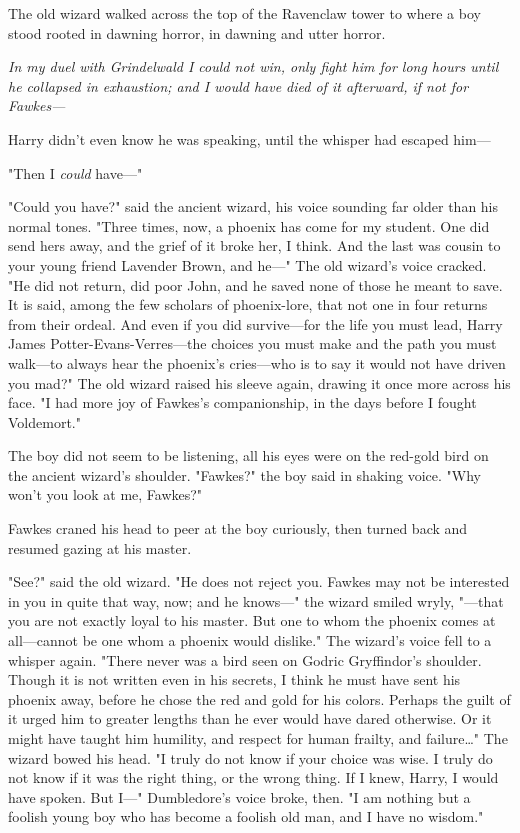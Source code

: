 The old wizard walked across the top of the Ravenclaw tower to where a boy 
stood rooted in dawning horror, in dawning and utter horror.

\emph{In my duel with Grindelwald I could not win, only fight him for long 
hours until he collapsed in exhaustion; and I would have died of it afterward, 
if not for Fawkes---}

Harry didn't even know he was speaking, until the whisper had escaped him---

"Then I \emph{could} have---"

"Could you have?" said the ancient wizard, his voice sounding far older than 
his normal tones. "Three times, now, a phoenix has come for my student. One did 
send hers away, and the grief of it broke her, I think. And the last was cousin 
to your young friend Lavender Brown, and he---" The old wizard's voice cracked. 
"He did not return, did poor John, and he saved none of those he meant to save. 
It is said, among the few scholars of phoenix-lore, that not one in four 
returns from their ordeal. And even if you did survive---for the life you must 
lead, Harry James Potter-Evans-Verres---the choices you must make and the path 
you must walk---to always hear the phoenix's cries---who is to say it would not 
have driven you mad?" The old wizard raised his sleeve again, drawing it once 
more across his face. "I had more joy of Fawkes's companionship, in the days 
before I fought Voldemort."

The boy did not seem to be listening, all his eyes were on the red-gold bird on 
the ancient wizard's shoulder. "Fawkes?" the boy said in shaking voice. "Why 
won't you look at me, Fawkes?"

Fawkes craned his head to peer at the boy curiously, then turned back and 
resumed gazing at his master.

"See?" said the old wizard. "He does not reject you. Fawkes may not be 
interested in you in quite that way, now; and he knows---" the wizard smiled 
wryly, "---that you are not exactly loyal to his master. But one to whom the 
phoenix comes at all---cannot be one whom a phoenix would dislike." The 
wizard's voice fell to a whisper again. "There never was a bird seen on Godric 
Gryffindor's shoulder. Though it is not written even in his secrets, I think he 
must have sent his phoenix away, before he chose the red and gold for his 
colors. Perhaps the guilt of it urged him to greater lengths than he ever would 
have dared otherwise. Or it might have taught him humility, and respect for 
human frailty, and failure{\ldots}" The wizard bowed his head. "I truly do not 
know if your choice was wise. I truly do not know if it was the right thing, or 
the wrong thing. If I knew, Harry, I would have spoken. But I---" Dumbledore's 
voice broke, then. "I am nothing but a foolish young boy who has become a 
foolish old man, and I have no wisdom."

